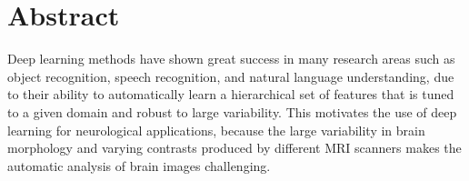 \chapter*{Abstract}




% 

Deep learning methods have shown great success in many research areas such as
object recognition, speech recognition, and natural language understanding, due
to their ability to automatically learn a hierarchical set of features that is
tuned to a given domain and robust to large variability. This motivates the use
of deep learning for neurological applications, because the large variability in
brain morphology and varying contrasts produced by different MRI scanners makes
the automatic analysis of brain images challenging.

